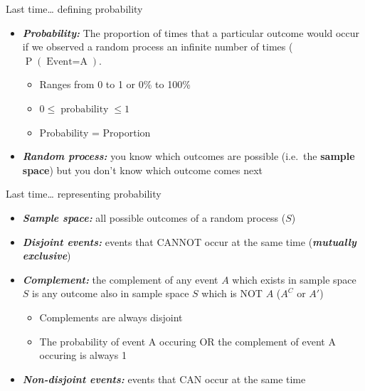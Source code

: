 \documentclass[
  ignorenonframetext,
]{beamer}
\begin{document}
\begin{frame}{Last time\ldots{} defining probability}
\label{last-time-defining-probability}
\begin{itemize}
\item
  \textbf{\emph{Probability:}} The proportion of times that a particular
  outcome would occur if we observed a random process an infinite number
  of times (\(\operatorname{P}(\operatorname{Event = A})\).

  \begin{itemize}
  \item
    Ranges from 0 to 1 or 0\% to 100\%
  \item
    \(0 \le \operatorname{probability} \le 1\)
  \item
    Probability = Proportion
  \end{itemize}
\item
  \textbf{\emph{Random process:}} you know which outcomes are possible
  (i.e.~the \textbf{sample space}) but you don't know which outcome
  comes next
\end{itemize}
\end{frame}

\begin{frame}{Last time\ldots{} representing probability}
\label{last-time-representing-probability}
\begin{itemize}
\item
  \textbf{\emph{Sample space:}} all possible outcomes of a random
  process (\(S\))
\item
  \textbf{\emph{Disjoint events:}} events that CANNOT occur at the same
  time (\textbf{\emph{mutually exclusive}})
\item
  \textbf{\emph{Complement:}} the complement of any event \(A\) which
  exists in sample space \(S\) is any outcome also in sample space \(S\)
  which is NOT \(A\) (\(A^C\) or \(A'\))

  \begin{itemize}
  \item
    Complements are always disjoint
  \item
    The probability of event A occuring OR the complement of event A
    occuring is always 1
  \end{itemize}
\item
  \textbf{\emph{Non-disjoint events:}} events that CAN occur at the same
  time
\end{itemize}
\end{frame}
\end{document}
